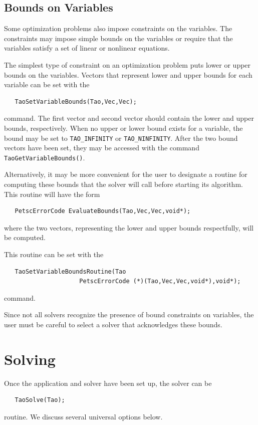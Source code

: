 \documentclass[]{book}
\begin{document}
\subsection{Bounds on Variables}\label{sec_bounds}

Some optimization problems also impose constraints on the variables.
The constraints may impose simple bounds on the variables or
require that the variables satisfy a set of linear or  nonlinear equations.

The simplest type of constraint on an optimization problem puts lower
or upper bounds on the variables. 
Vectors that represent lower and upper bounds for each variable 
can be set with the   %
\begin{verbatim}
   TaoSetVariableBounds(Tao,Vec,Vec);
\end{verbatim}
command. 
The first vector and second vector should contain the lower and upper 
bounds, respectively.
When no upper or lower bound exists for a variable, the bound
may be set to {\tt TAO\_INFINITY} or {\tt TAO\_NINFINITY}.
After the two bound vectors have been set, they may be accessed
with the command  {\tt TaoGetVariableBounds()}.

Alternatively, it may be more convenient for the user to designate a routine 
for computing these bounds
that the solver will call before starting its algorithm.  This routine will
have the form
\begin{verbatim}
   PetscErrorCode EvaluateBounds(Tao,Vec,Vec,void*);
\end{verbatim}
where the two vectors, representing the lower and upper bounds respectfully, 
will be computed.

This routine can be set with the 
\begin{verbatim}
   TaoSetVariableBoundsRoutine(Tao
                     PetscErrorCode (*)(Tao,Vec,Vec,void*),void*);
\end{verbatim}
command.
   
Since not all solvers recognize the presence of bound constraints on 
variables, the user must be careful 
to select a solver that acknowledges these bounds.


\section{Solving}
Once the application and solver have been set up, the solver can be 
\begin{verbatim}
   TaoSolve(Tao);
\end{verbatim}
routine.
We discuss several universal options below. 
\end{document}
